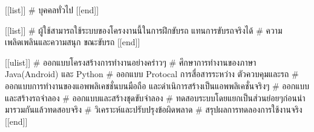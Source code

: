     [[list]]
        # บุคคลทั่วไป
    [[end]]

    [[list]]
        # ผู้ใช้สามารถใช้ระบบของโครงงานนี้ในการฝึกขับรถ แทนการขับรถจริงได้
        # ความเพลิดเพลินและความสนุก ขณะขับรถ
    [[end]]

    [[ulist]]
        # ออกแบบโครงสร้างการทำงานอย่างคร่าวๆ
        # ศึกษาการทำงานของภาษา Java(Android) และ Python
        # ออกแบบ Protocal การสื่อสารระหว่าง ตัวควบคุมและรถ
        # ออกแบบการทำงานของแอพพลิเคชชั่นบนมือถือ และดำเนิการสร้างเป็นแอพพลิเคชั่นจริงๆ
        # ออกแบบและสร้างรถจำลอง
        # ออกแบบและสร้างชุดขับจำลอง
        # ทดสอบระบบโดยแยกเป็นส่วนย่อยๆก่อนนำมารวมกันแล้วทดสอบจริง
        # วิเคราะห์และปรับปรุงข้อผิดพลาด
        # สรุปผลการทดลองการใช้งานจริง
    [[end]]


